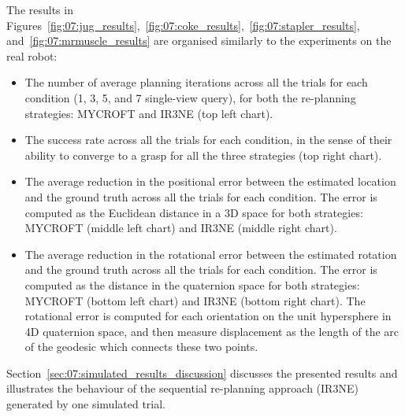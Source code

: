 The results in Figures~\ref{fig:07:jug_results},~\ref{fig:07:coke_results},~\ref{fig:07:stapler_results}, and~\ref{fig:07:mrmuscle_results} are organised similarly to the experiments on the real robot:
\begin{itemize}
\item The number of average planning iterations across all the trials for each condition (1, 3, 5, and 7 single-view query), for both the re-planning strategies: MYCROFT and IR3NE (top left chart). 

\item The success rate across all the trials for each condition, in the sense of their ability to converge to a grasp for all the three strategies (top right chart). 

\item The average reduction in the positional error between the estimated location and the ground truth across all the trials for each condition. The error is computed as the Euclidean distance in a 3D space for both strategies: MYCROFT (middle left chart) and IR3NE (middle right chart).

\item The average reduction in the rotational error between the estimated rotation and the ground truth across all the trials for each condition. The error is computed as the distance in the quaternion space for both strategies: MYCROFT (bottom left chart) and IR3NE (bottom right chart). The rotational error is computed for each orientation on the unit hypersphere in 4D quaternion space, and then measure displacement as the length of the arc of the geodesic which connects these two points.
\end{itemize}

Section~\ref{sec:07:simulated_results_discussion} discusses the presented results and illustrates the behaviour of the sequential re-planning approach (IR3NE) generated by one simulated trial.

